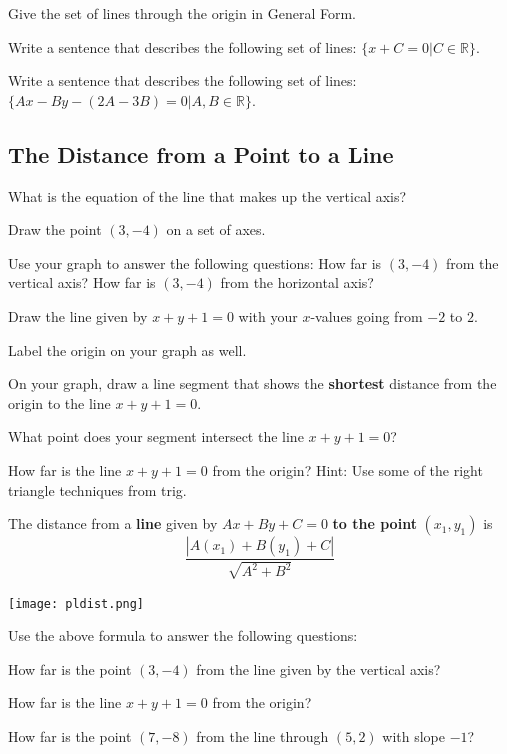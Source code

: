 \bq Give the set of lines through the origin in General Form.
\eq

\bq Write a sentence that describes the following set of lines: $\{ x+C=0| C \in \mathbb{R}\}$.
\eq

\bq Write a sentence that describes the following set of lines: $\{ Ax-By-(2A-3B)=0| A,B \in \mathbb{R} \}$.
\eq

\subsection{The Distance from a Point to a Line}
\bq
\be
\item What is the equation of the line that makes up the vertical axis?
\item Draw the point $(3,-4)$ on a set of axes.
\item Use your graph to answer the following questions:
\subitem How far is $(3,-4)$ from the vertical axis?
\subitem How far is $(3,-4)$ from the horizontal axis?
\ee
\eq

\bq
\be
\item Draw the line given by $x+y+1=0$ with your $x$-values going from $-2$ to $2$.
\item Label the origin on your graph as well.
\item On your graph, draw a line segment that shows the \textbf{shortest} distance from the origin to the line $x+y+1=0$.
\item What point does your segment intersect the line $x+y+1=0$?
\item How far is the line $x+y+1=0$ from the origin? Hint: Use some of the right triangle techniques from trig.
\ee
\eq

\begin{info}
The distance from a \textbf{line} given by $Ax+By+C=0$ \textbf{to the point} $(x_1,y_1)$ is $$\frac{|A(x_1)+B(y_1)+C|}{\sqrt{A^2+B^2}}$$

\begin{center} \texttt{[image: pldist.png]} \end{center}
\end{info}

\bq Use the above formula to answer the following questions:
\be
\item How far is the point $(3,-4)$ from the line given by the vertical axis?
\item How far is the line $x+y+1=0$ from the origin?
\item How far is the point $(7,-8)$ from the line through $(5,2)$ with slope $-1$?
\ee
\eq

